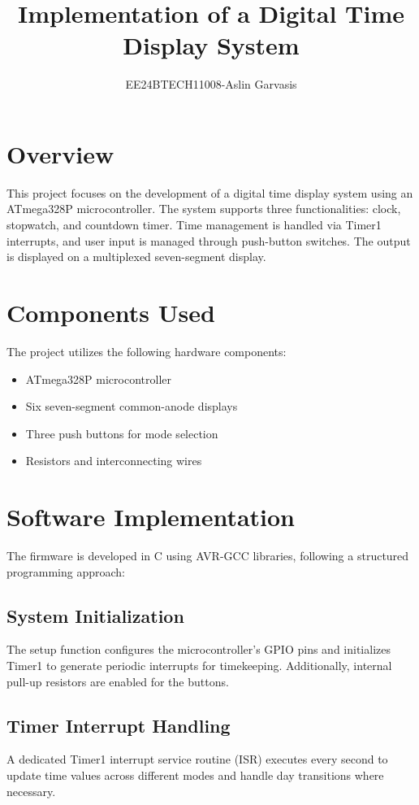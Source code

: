 \documentclass[journal]{IEEEtran}
\numberwithin{equation}{enumi}
\numberwithin{figure}{enumi}
\begin{document}


\title{Implementation of a Digital Time Display System}
\author{EE24BTECH11008-Aslin Garvasis}

{\let\newpage\relax\maketitle}

\section*{Overview}
This project focuses on the development of a digital time display system using an ATmega328P microcontroller. The system supports three functionalities: clock, stopwatch, and countdown timer. Time management is handled via Timer1 interrupts, and user input is managed through push-button switches. The output is displayed on a multiplexed seven-segment display.

\section*{Components Used}
The project utilizes the following hardware components:
\begin{itemize}
    \item ATmega328P microcontroller
    \item Six seven-segment common-anode displays
    \item Three push buttons for mode selection
    \item Resistors and interconnecting wires
\end{itemize}

\section*{Software Implementation}
The firmware is developed in C using AVR-GCC libraries, following a structured programming approach:

\subsection{System Initialization}
The setup function configures the microcontroller’s GPIO pins and initializes Timer1 to generate periodic interrupts for timekeeping. Additionally, internal pull-up resistors are enabled for the buttons.

\subsection{Timer Interrupt Handling}
A dedicated Timer1 interrupt service routine (ISR) executes every second to update time values across different modes and handle day transitions where necessary.
\end{document}
